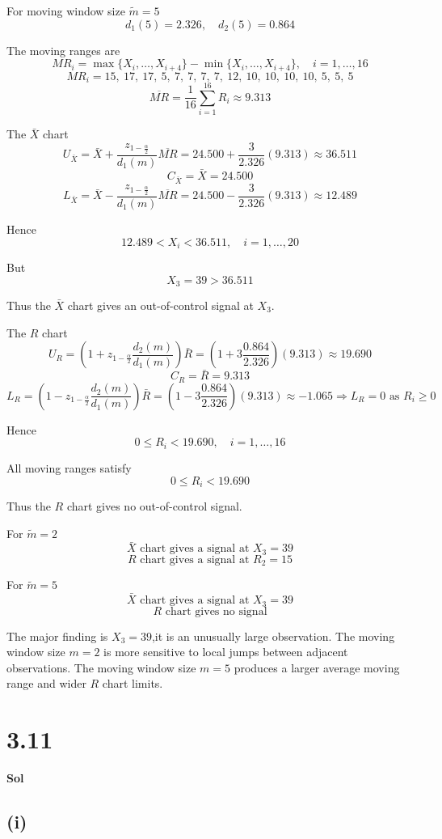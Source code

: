 \documentclass[a4paper, 12pt]{article}  %
\begin{document}
For moving window size $\tilde m=5$
$$
d_1(5)=2.326,\quad d_2(5)=0.864
$$

The moving ranges are
$$
MR_i=\max\{X_i,\ldots,X_{i+4}\}-\min\{X_i,\ldots,X_{i+4}\},\quad i=1,\ldots,16
$$
$$
MR_i=15,\ 17,\ 17,\ 5,\ 7,\ 7,\ 7,\ 7,\ 12,\ 10,\ 10,\ 10,\ 10,\ 5,\ 5,\ 5
$$
$$
\overline{MR}=\frac{1}{16}\sum_{i=1}^{16}R_i\approx 9.313
$$

The \(\bar X\) chart
$$
U_{\bar X}=\bar X+\frac{z_{1-\frac{\alpha}{2}}}{d_1(m)}\overline{MR}=24.500+\frac{3}{2.326}(9.313)\approx 36.511
$$
$$
C_{\bar X}=\bar X=24.500
$$
$$
L_{\bar X}=\bar X-\frac{z_{1-\frac{\alpha}{2}}}{d_1(m)}\overline{MR}=24.500-\frac{3}{2.326}(9.313)\approx 12.489
$$

Hence
$$
12.489<X_i<36.511,\quad i=1,\ldots,20
$$

But
$$
X_3=39>36.511
$$

Thus the \(\bar X\) chart gives an out-of-control signal at \(X_3\).

The \(R\) chart
$$
U_R=\left(1+z_{1-\frac{\alpha}{2}}\frac{d_2(m)}{d_1(m)}\right)\bar R=\left(1+3\frac{0.864}{2.326}\right)(9.313)\approx 19.690
$$
$$
C_R=\bar R=9.313
$$
$$
L_R=\left(1-z_{1-\frac{\alpha}{2}}\frac{d_2(m)}{d_1(m)}\right)\bar R=\left(1-3\frac{0.864}{2.326}\right)(9.313)\approx -1.065\Rightarrow L_R=0 \text{ as } R_i\ge0
$$

Hence
$$
0\le R_i<19.690,\quad i=1,\ldots,16
$$

All moving ranges satisfy
$$
0\le R_i<19.690
$$

Thus the \(R\) chart gives no out-of-control signal.

For \(\tilde m=2\)
$$
\bar X\text{ chart gives a signal at }X_3=39
$$
$$
R\text{ chart gives a signal at }R_2=15
$$

For \(\tilde m=5\)
$$
\bar X\text{ chart gives a signal at }X_3=39
$$
$$
R\text{ chart gives no signal}
$$

The major finding is $X_3=39$,it is an unusually large observation. 
The moving window size \(m=2\) is more sensitive to local jumps between adjacent observations.
The moving window size \(m=5\) produces a larger average moving range and wider \(R\) chart limits.


\section*{3.11}
\textbf{Sol}

\subsection*{(i)}
\end{document}
